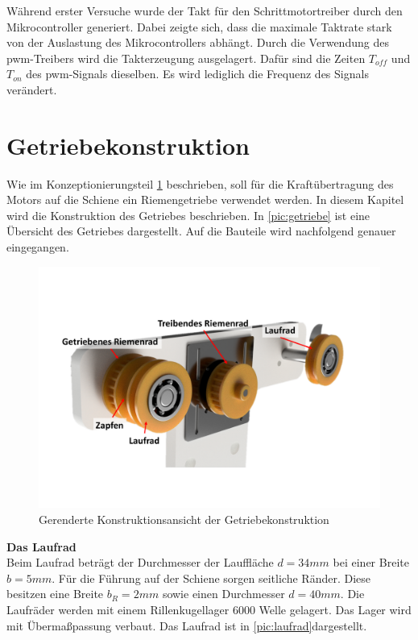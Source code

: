 Während erster Versuche wurde der Takt für den Schrittmotortreiber durch den Mikrocontroller generiert. Dabei zeigte sich, dass die maximale Taktrate stark von der Auslastung des Mikrocontrollers abhängt. Durch die Verwendung des \acrshort{pwm}-Treibers wird die Takterzeugung ausgelagert. Dafür sind die Zeiten $T_{off}$ und $T_{on}$ des \acrshort{pwm}-Signals dieselben. Es wird lediglich die Frequenz des Signals verändert. 
 \newpage

\section{Getriebekonstruktion}
\label{sec:getriebekonstruktion}
Wie im Konzeptionierungsteil \ref{sec:getriebekonstruktion} beschrieben, soll für die Kraftübertragung des Motors auf die Schiene ein Riemengetriebe verwendet werden. In diesem Kapitel wird die Konstruktion des Getriebes beschrieben. In \autoref{pic:getriebe} ist eine Übersicht des Getriebes dargestellt. Auf die Bauteile wird nachfolgend genauer eingegangen. 

\begin{figure}[h]
	\begin{center}
		\includegraphics[width=12cm]{getriebe.pdf}
		\caption{Gerenderte Konstruktionsansicht der Getriebekonstruktion}
		\label{pic:getriebe}
	\end{center}
\end{figure} 



\textbf{Das Laufrad}\\
Beim Laufrad beträgt der Durchmesser der Lauffläche $d=34mm$ bei einer Breite $b=5mm$. Für die Führung auf der Schiene sorgen seitliche Ränder. Diese besitzen eine Breite $b_R=2mm$ sowie einen Durchmesser $d=40mm$. Die Laufräder werden mit einem Rillenkugellager 6000 Welle gelagert. Das Lager wird mit Übermaßpassung verbaut. Das Laufrad ist in \autoref{pic:laufrad}dargestellt. \\

